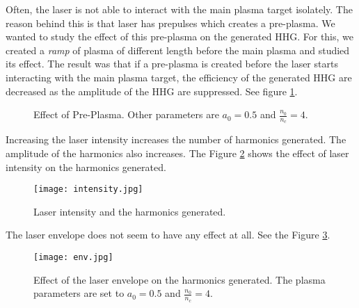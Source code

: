 
Often, the laser is not able to interact with the main plasma target isolately. The reason behind this is that laser has prepulses which creates a pre-plasma. We wanted to study the effect of this pre-plasma on the generated HHG. For this, we created a \textit{ramp} of plasma of different length before the main plasma and studied its effect. The result was that if a pre-plasma is created before the laser starts interacting with the main plasma target, the efficiency of the generated HHG are decreased as the amplitude of the HHG are suppressed. See figure \ref{fig:ramp}.

\begin{figure}[H]
    \centering
    \quad
    \caption{Effect of Pre-Plasma. Other parameters are $a_0 = 0.5$ and $\frac{n_0}{n_c} = 4$.}
    \label{fig:ramp}
\end{figure}


Increasing the laser intensity increases the number of harmonics generated. The amplitude of the harmonics also increases. The Figure \ref{fig:intensity} shows the effect of laser intensity on the harmonics generated.

\begin{figure}[h]
    \centering
    \texttt{[image: intensity.jpg]}
    \caption{Laser intensity and the harmonics generated.}
    \label{fig:intensity}
\end{figure}

The laser envelope does not seem to have any effect at all. See the Figure \ref{fig:env}.

\begin{figure}[H]
    \centering
    \texttt{[image: env.jpg]}
    \caption{Effect of the laser envelope on the harmonics generated. The plasma parameters are set to $a_0 = 0.5$ and $\frac{n_0}{n_c} = 4$.}
    \label{fig:env}
\end{figure}

